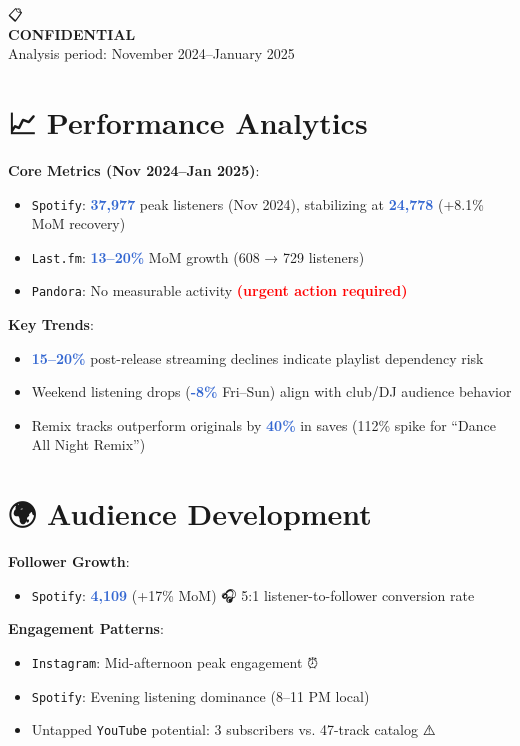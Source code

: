 \documentclass[11pt]{article}
\newcommand{\platform}[1]{\textcolor{accent}{\texttt{#1}}}
\newcommand{\metric}[1]{\textcolor{highlight}{\textbf{#1}}}
\newcommand{\icon}[1]{{\emojifont\scriptsize#1}}
\begin{document}
\afterpage{\fancyhead[C]{}}
\pagestyle{fancy}

\begin{center}
\emojifont\huge📋\\[-5pt]
\textcolor{accent}{\sffamily\LARGE\textbf{CONFIDENTIAL}}\\[3pt]
\small Analysis period: November 2024–January 2025
\end{center}

\section*{📈 Performance Analytics}
\textbf{Core Metrics (Nov 2024–Jan 2025)}:
\begin{itemize}
\item \platform{Spotify}: \metric{37,977} peak listeners (Nov 2024), stabilizing at \metric{24,778} (+8.1\% MoM recovery)
\item \platform{Last.fm}: \metric{13–20\%} MoM growth (608 → 729 listeners)
\item \platform{Pandora}: No measurable activity \textcolor{red}{\textbf{(urgent action required)}}
\end{itemize}

\textbf{Key Trends}:
\begin{itemize}
\item \metric{15–20\%} post-release streaming declines indicate playlist dependency risk
\item Weekend listening drops (\metric{-8\%} Fri–Sun) align with club/DJ audience behavior
\item Remix tracks outperform originals by \metric{40\%} in saves (112\% spike for ``Dance All Night Remix'')
\end{itemize}

\section*{🌍 Audience Development}
\textbf{Follower Growth}:
\begin{itemize}
item \platform{Instagram}: \metric{4,875} (+22\% since Jul 2024) \icon{📸}
\item \platform{Spotify}: \metric{4,109} (+17\% MoM) \icon{🎧} 5:1 listener-to-follower conversion rate
\end{itemize}

\textbf{Engagement Patterns}:
\begin{itemize}
\item \platform{Instagram}: Mid-afternoon peak engagement \icon{⏰}
\item \platform{Spotify}: Evening listening dominance (8–11 PM local) \icon{🌙}
\item Untapped \platform{YouTube} potential: 3 subscribers vs. 47-track catalog \icon{⚠️}
\end{itemize}
\end{document}

